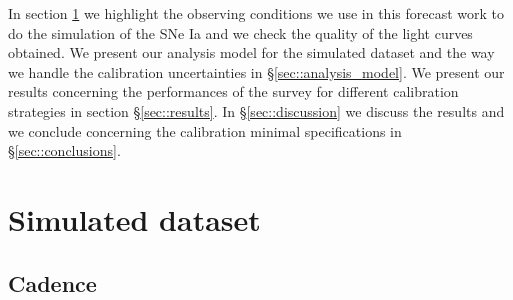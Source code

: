 \documentclass[\docopts]{\docclass}
\begin{document}
In section \ref{sec::simulated_dataset} we highlight the observing conditions we use in this forecast work to do the simulation of the SNe Ia and we check the quality of the light curves obtained.
We present our analysis model for the simulated dataset and the way we handle the calibration uncertainties in §\ref{sec::analysis_model}.
We present our results concerning the performances of the survey for different calibration strategies in section §\ref{sec::results}.
In §\ref{sec::discussion} we discuss the results and we conclude concerning the calibration minimal specifications in §\ref{sec::conclusions}.





\section{Simulated dataset}
\label{sec::simulated_dataset}

\subsection{Cadence}
\label{subsec::cadence}
\end{document}
